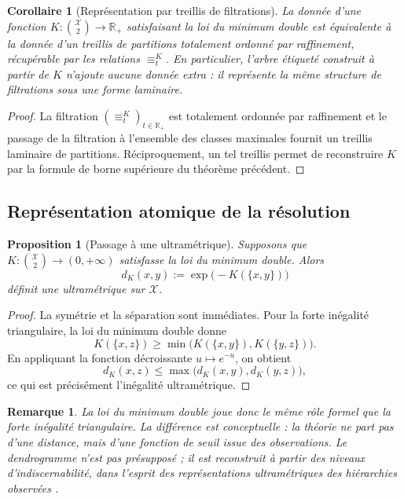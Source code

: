\documentclass[11pt,a4paper]{article}
\newtheorem{proposition}{Proposition}
\newtheorem{corollary}{Corollaire}
\newtheorem{remark}{Remarque}
\begin{document}
\begin{corollary}[Représentation par treillis de filtrations]
La donnée d'une fonction \(K:\binom{\mathcal X}{2}\to\mathbb R_+\) satisfaisant la loi du minimum double est équivalente à la donnée d'un treillis de partitions totalement ordonné par raffinement, récupérable par les relations \(\equiv_t^K\). En particulier, l'arbre étiqueté construit à partir de \(K\) n'ajoute aucune donnée extra : il représente la même structure de filtrations sous une forme laminaire.
\end{corollary}

\begin{proof}
La filtration \((\equiv_t^K)_{t\in\mathbb R_+}\) est totalement ordonnée par raffinement et le passage de la filtration à l'ensemble des classes maximales fournit un treillis laminaire de partitions. Réciproquement, un tel treillis permet de reconstruire \(K\) par la formule de borne supérieure du théorème précédent.
\end{proof}

\subsection{Représentation atomique de la résolution}

\begin{proposition}[Passage à une ultramétrique]
Supposons que \(K:\binom{\mathcal X}{2}\to(0,+\infty)\) satisfasse la loi du minimum double. Alors
\[
d_K(x,y):=\exp\!\bigl(-K(\{x,y\})\bigr)
\]
définit une ultramétrique sur \(\mathcal X\).
\end{proposition}

\begin{proof}
La symétrie et la séparation sont immédiates. Pour la forte inégalité triangulaire, la loi du minimum double donne
\[
K(\{x,z\})\ge \min\bigl(K(\{x,y\}),K(\{y,z\})\bigr).
\]
En appliquant la fonction décroissante \(u\mapsto e^{-u}\), on obtient
\[
d_K(x,z)\le \max\bigl(d_K(x,y),d_K(y,z)\bigr),
\]
ce qui est précisément l'inégalité ultramétrique.
\end{proof}

\begin{remark}
La loi du minimum double joue donc le même rôle formel que la forte inégalité triangulaire. La différence est conceptuelle : la théorie ne part pas d'une distance, mais d'une fonction de seuil issue des observations. Le dendrogramme n'est pas présupposé ; il est reconstruit à partir des niveaux d'indiscernabilité, dans l'esprit des représentations ultramétriques des hiérarchies observées \cite{murtagh2004a,murtagh2004b,rohlf1973}.
\end{remark}
\end{document}
